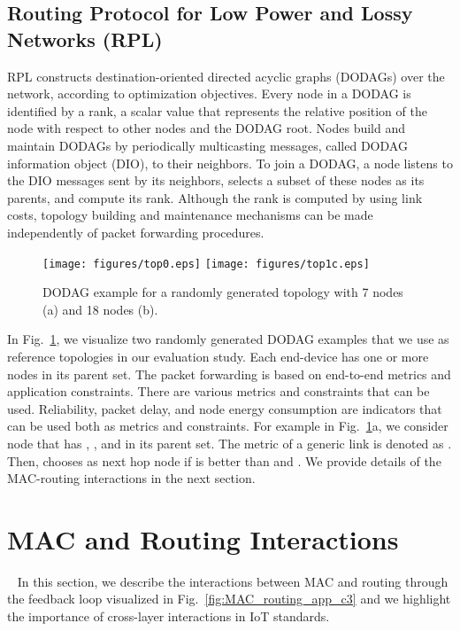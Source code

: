 \documentclass[review, 1p, 11pt]{elsarticle}
\numberwithin{equation}{section}
\begin{document}
\subsection{Routing Protocol for Low Power and Lossy Networks (RPL)}\label{sec:routing-protocols}
RPL constructs destination-oriented directed acyclic graphs
(DODAGs) over the network, according to optimization objectives.
Every node in a DODAG is identified by a rank, a scalar value
that represents the relative position of the node with respect to
other nodes and the DODAG root.
Nodes build and maintain DODAGs by periodically multicasting
messages, called DODAG information object (DIO), to their
neighbors. To join a
DODAG, a node listens to the DIO messages sent by its neighbors,
selects a subset of these nodes as its parents, and compute its rank.
Although the rank is computed by using link costs, topology building and
maintenance mechanisms can be made independently of packet
forwarding procedures.



\begin{figure}\centering
  \texttt{[image: figures/top0.eps]}
  \texttt{[image: figures/top1c.eps]}
  \caption{DODAG example for a randomly generated topology with 7 nodes (a) and 18 nodes (b).}
  \label{fig:topology}
\end{figure}

In Fig.~\ref{fig:topology}, we visualize two randomly generated DODAG examples that we use as reference topologies in our evaluation study.
Each end-device has one or more nodes in its parent set.
The packet forwarding is based on end-to-end metrics and application
constraints. There are various metrics and constraints that can be
used. Reliability, packet delay, and node energy consumption are
indicators that can be used both as metrics and constraints.
For example in Fig.~\ref{fig:topology}a, we consider node  that has , , and  in its parent set.
The metric of a generic link  is denoted as  . Then,  chooses  as next hop
node if  is better than  and  .
We provide details of the MAC-routing interactions in the next section.


\section{MAC and Routing Interactions}~\label{sec:complex-relation}
In this section, we describe the interactions between MAC and routing through the
feedback loop visualized in Fig.~\ref{fig:MAC_routing_app_c3} and we highlight the importance of cross-layer interactions
in IoT standards.
\end{document}
